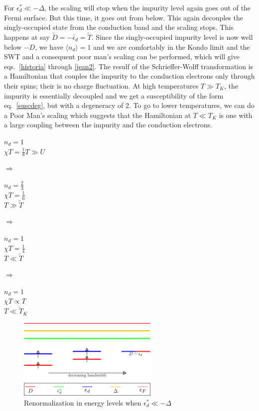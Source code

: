 For \(\epsilon_d^* \ll -\Delta\), the scaling will stop when the impurity level again goes out of the Fermi surface.
But this time, it goes out from below.
This again decouples the singly-occupied state from the conduction band and the scaling stops.
This happens at say \(\widetilde D = -\widetilde {\epsilon_d} = \widetilde {T}\).
Since the singly-occupied impurity level is now well below \(-D\), we have \(\langle  n_d\rangle = 1\) and we are comfortably in the Kondo limit and the SWT and a consequent poor man's scaling can be performed, which will give eqs.~\ref{historia} through \ref{jean2}.
The resulf of the Schrieffer-Wolff transformation is a Hamiltonian that couples the impurity to the conduction electrons only through their spins; their is no charge fluctuation.
At high temperatures \(T \gg T_K\), the impurity is essentially decoupled and we get a susceptibility of the form eq.~\ref{suscdeg}, but with a degeneracy of 2.
To go to lower temperatures, we can do a Poor Man's scaling which suggests that the Hamiltonian at \(T\ll T_K\) is one with a large coupling between the impurity and the conduction electrons.
\begin{center}
\begin{minipage}{50pt}
	\(n_d = 1\)\\\(\chi T = \frac{1}{8}\)\(T\gg U\)
\end{minipage}
\hspace*{20pt}\(\Longrightarrow\)\hspace*{20pt}
\begin{minipage}{50pt}
	\(n_d = \frac{2}{3}\)\\\(\chi T = \frac{1}{6}\)\\\(T\gg \widetilde T\)
\end{minipage}
\hspace*{20pt}\(\Longrightarrow\)\hspace*{20pt}
\begin{minipage}{50pt}
	\(n_d = 1\)\\\(\chi T= \frac{1}{4}\)\\\(T\ll \widetilde T\)
\end{minipage}
\hspace*{20pt}\(\Longrightarrow\)\hspace*{20pt}
\begin{minipage}{50pt}
	\(n_d = 1\)\\\(\chi T \propto T\)\\\(T\ll \widetilde T_K\)
\end{minipage}
\end{center}
\begin{figure}
	\centering 
	\includegraphics[width=0.6\textwidth]{../figures/empty.png}
	\caption{Renormalization in energy levels when \(\epsilon_d^* \ll -\Delta\)}
\end{figure}

